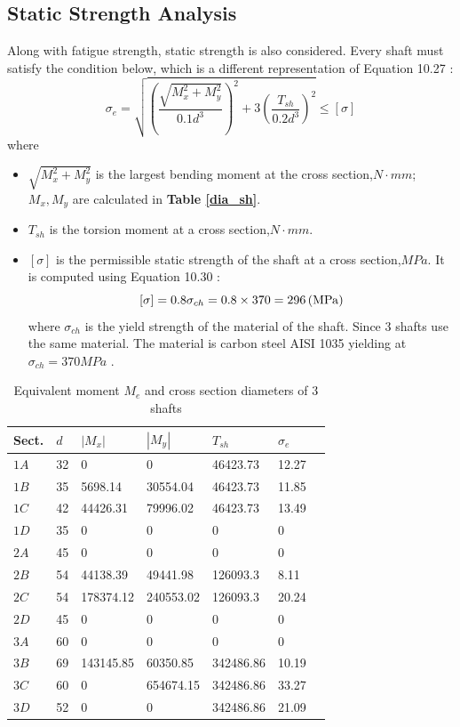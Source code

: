 \subsection{Static Strength Analysis}
Along with fatigue strength, static strength is also considered. Every shaft must satisfy the condition below, which is a different representation of Equation 10.27 \cite{tk1}:
\[\sigma_e = \sqrt{\left( \dfrac{\sqrt{M_x^2+M_y^2}}{0.1d^3}\right)^2 + 3\left( \dfrac{T_{sh}}{0.2d^3}\right) ^2} \leq [\sigma]\]
where
\begin{itemize}
	\item $ \sqrt{M_x^2+M_y^2} $ is the largest bending moment at the cross section,$ \unit{N\cdot mm} $; $ M_x, M_y $ are calculated in \textbf{Table \ref{dia_sh}}.
	\item $ T_{sh} $ is the torsion moment at a cross section,$ \unit{N\cdot mm} $.
	\item $ [\sigma] $ is the permissible static strength of the shaft at a cross section,$ \unit{MPa} $. It is computed using Equation 10.30 \cite{tk1}:
	\[[\sigma] = 0.8\sigma_{ch} = 0.8\times 370 = 296 \, (\mathrm{MPa}) \]
	where $ \sigma_{ch} $ is the yield strength of the material of the shaft. Since 3 shafts use the same material. The material is carbon steel AISI 1035 yielding at $ \sigma_{ch} = 370\unit{MPa} $ \cite{aisi1035}.
\end{itemize}

\begin{table}[ht]
	\centering
	\caption{Equivalent moment $ M_e $ and cross section diameters of 3 shafts}
	\begin{tabular}{lllllll}\toprule
		Sect. & $ d $ & $ |M_x| $ & $ |M_y| $ & $ T_{sh} $ & $ \sigma_e $ \\ \midrule
		$ 1A $	& 32 &	0			&	0			&	46423.73	& 12.27\\
		$ 1B $	& 35 &	5698.14		&	30554.04	&	46423.73	& 11.85\\
		$ 1C $	& 42 &	44426.31	&	79996.02	&	46423.73	& 13.49\\
		$ 1D $	& 35 &	0			&	0			&	0			& 0    \\
		$ 2A $	& 45 &	0			&	0			&	0			& 0	   \\
		$ 2B $	& 54 &	44138.39	&	49441.98	&	126093.3	& 8.11 \\
		$ 2C $	& 54 &	178374.12	&	240553.02	&	126093.3	& 20.24\\
		$ 2D $	& 45 &	0			&	0			&	0			& 0	   \\
		$ 3A $	& 60 &	0			&	0			&	0			& 0	   \\
		$ 3B $	& 69 &	143145.85	&	60350.85	&	342486.86	& 10.19 \\
		$ 3C $	& 60 &	0			&	654674.15	&	342486.86	& 33.27\\
		$ 3D $	& 52 &	0			&	0			&	342486.86	& 21.09\\
		\bottomrule
	\end{tabular}
	\label{static stress}
\end{table}

%

